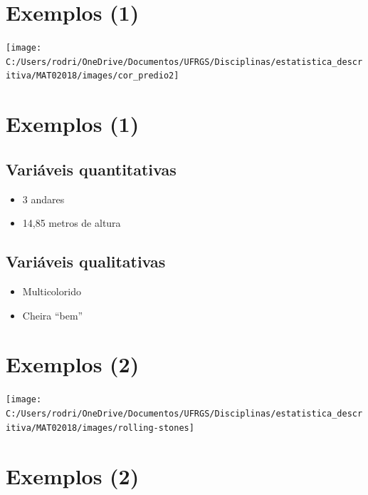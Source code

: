 \documentclass[]{tufte-book}
\providecommand{\tightlist}{%
  \setlength{\itemsep}{0pt}\setlength{\parskip}{0pt}}
\begin{document}
\hypertarget{exemplos-1}{%
\section{Exemplos (1)}\label{exemplos-1}}

\begin{center}\texttt{[image: C:/Users/rodri/OneDrive/Documentos/UFRGS/Disciplinas/estatistica\_descritiva/MAT02018/images/cor\_predio2]} \end{center}

\hypertarget{exemplos-1-1}{%
\section{Exemplos (1)}\label{exemplos-1-1}}

\hypertarget{variuxe1veis-quantitativas-1}{%
\subsection{Variáveis
quantitativas}\label{variuxe1veis-quantitativas-1}}

\begin{itemize}
\tightlist
\item
  3 andares
\item
  14,85 metros de altura
\end{itemize}

\hypertarget{variuxe1veis-qualitativas-1}{%
\subsection{Variáveis qualitativas}\label{variuxe1veis-qualitativas-1}}

\begin{itemize}
\tightlist
\item
  Multicolorido
\item
  Cheira ``bem''
\end{itemize}

\hypertarget{exemplos-2}{%
\section{Exemplos (2)}\label{exemplos-2}}

\begin{center}\texttt{[image: C:/Users/rodri/OneDrive/Documentos/UFRGS/Disciplinas/estatistica\_descritiva/MAT02018/images/rolling-stones]} \end{center}

\hypertarget{exemplos-2-1}{%
\section{Exemplos (2)}\label{exemplos-2-1}}
\end{document}
